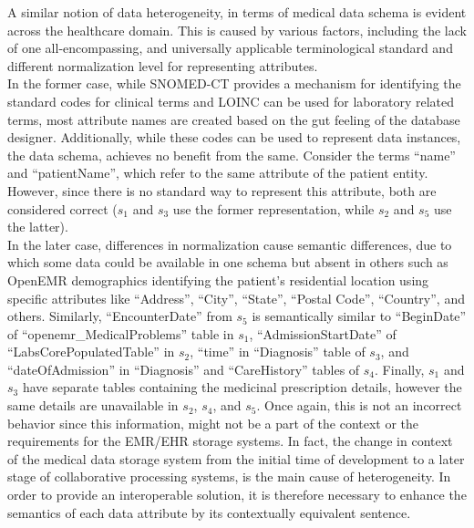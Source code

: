 \documentclass{ieeeaccess}
\begin{document}
A similar notion of data heterogeneity, in terms of medical data schema is evident across the healthcare domain. This is caused by various factors, including the lack of one all-encompassing, and universally applicable terminological standard and different normalization level for representing attributes.\\
In the former case, while SNOMED-CT provides a mechanism for identifying the standard codes for clinical terms and LOINC can be used for laboratory related terms, most attribute names are created based on the gut feeling of the database designer. Additionally, while these codes can be used to represent data instances, the data schema, achieves no benefit from the same.  Consider the terms ``name'' and ``patientName'', which refer to the same attribute of the patient entity.  However, since there is no standard way to represent this attribute, both are considered correct ($s_1$ and $s_3$ use the former representation, while $s_2$ and $s_5$ use the latter).\\
In the later case, differences in normalization cause semantic differences, due to which some data could be available in one schema but absent in others such as OpenEMR demographics identifying the patient's residential location using specific attributes like ``Address'', ``City'', ``State'', ``Postal Code'', ``Country'', and others. Similarly, ``EncounterDate'' from $s_5$ is semantically similar to ``BeginDate'' of ``openemr\_MedicalProblems'' table in $s_1$, ``AdmissionStartDate'' of ``LabsCorePopulatedTable'' in $s_2$, 
``time'' in ``Diagnosis'' table of $s_3$, and  ``dateOfAdmission'' in ``Diagnosis'' and ``CareHistory'' tables of $s_4$.
Finally, $s_1$ and $s_3$ have separate tables containing the medicinal prescription details, however the same details are unavailable in $s_2$, $s_4$, and $s_5$. Once again, this is not an incorrect behavior since this information, might not be a part of the context or the requirements for the EMR/EHR storage systems.
In fact, the change in context of the medical data storage system from the initial time of development to a later stage of collaborative processing systems, is the main cause of heterogeneity. In order to provide an interoperable solution, it is therefore necessary to enhance the semantics of each data attribute by its contextually equivalent sentence. 
\end{document}
